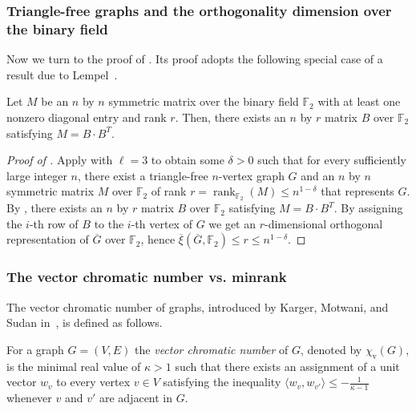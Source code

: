 \documentclass{toc}
\newcommand{\Fset}{\mathbb{F}}
\newcommand{\od}{\overline{\xi}}
\newcommand{\rank}{\mathop{\mathrm{rank}}}
\newcommand{\vchrom}{{\chi_\mathrm{v}}}
\begin{document}
\subsubsection{Triangle-free graphs and the orthogonality dimension over the binary field}\label{sec:OD_F_2_triangle}

%
Now we turn to the proof of  %
.
Its proof adopts the following special case of a result due to Lempel~\cite{Lempel75}.
\begin{lemma}\label{lem:lempel}
Let $M$ %
be  %
an $n$ by $n$ symmetric matrix over the binary field $\Fset_2$ with at least one nonzero diagonal entry and rank $r$. Then, there exists an $n$ by $r$ matrix $B$ over $\Fset_2$ satisfying $M = B \cdot B^T$.
\end{lemma}

\begin{proof}[Proof of ]
Apply  with $\ell = 3$ to obtain some $\delta >0$ such that for every sufficiently large integer $n$, there exist a triangle-free $n$-vertex graph $G$ and an $n$ by $n$ symmetric matrix $M$ over $\Fset_2$ of rank $r = {\rank}_{\Fset_2}(M) \leq n^{1-\delta}$ that represents $G$.
By , there exists an $n$ by $r$ matrix $B$ over $\Fset_2$ satisfying $M = B \cdot B^T$.
By assigning the $i$-th row of $B$ to the $i$-th vertex of $G$ we get an $r$-dimensional orthogonal representation of $\overline{G}$ over $\Fset_2$, hence $\od(\overline{G},\Fset_2) \leq r \leq n^{1-\delta}$.
\end{proof}

\subsubsection{The vector chromatic number vs. minrank}

The vector chromatic number of graphs, introduced by Karger, Motwani, and Sudan in~\cite{KargerMS98}, is defined as follows.

\begin{definition}\label{def:chi_v}
For a graph $G=(V,E)$ the \emph{vector chromatic number} of $G$,
denoted by $\vchrom(G)$, is the minimal real value of $\kappa > 1$ such
that there exists an assignment of a unit vector $w_v$ to every
vertex $v \in V$ satisfying the inequality $\langle w_{v}, w_{v'} \rangle \leq
-\frac{1}{\kappa -1}$ whenever $v$ and $v'$ are adjacent in $G$.
\end{definition}
\end{document}
